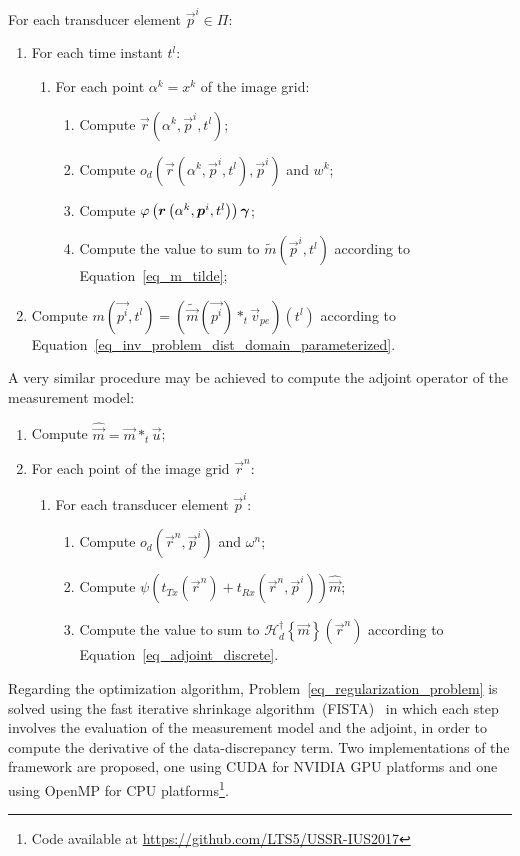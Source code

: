 \documentclass[conference]{IEEEtran}
\begin{document}
For each transducer element $\vec{p}^i \in \Pi$:
\begin{enumerate}
	\item For each time instant $t^l$:
	\begin{enumerate}
		\item For each point $\alpha^k = x^k$ of the image grid:
		\begin{enumerate}
			\item Compute $\vec{r}\left(\alpha^k, \vec{p}^i, t^l\right)$;
			\item Compute $o_d\left(\vec{r}\left(\alpha^k, \vec{p}^i, t^l\right), \vec{p}^i\right)$ and $w^k$;
			\item Compute $\varphi \left(\bm{r}\left(\alpha^k, \bm{p}^i, t^l\right)\right) \bm{\gamma}$;
			\item Compute the value to sum to $\tilde{m}\left(\vec{p}^i, t^l\right)$ according to Equation~\eqref{eq_m_tilde};
		\end{enumerate} 
	\end{enumerate}
	\item Compute $m \left(\vec{p^i}, t^l\right) = \left(\tilde{\vec{m}} \left(\vec{p^i}\right) \ast_t \vec{v}_{pe}\right) \left(t^l\right)$ according to Equation~\eqref{eq_inv_problem_dist_domain_parameterized}.
\end{enumerate}

A very similar procedure may be achieved to compute the adjoint operator of the measurement model:
\begin{enumerate}
	\item Compute $\hat{\vec{m}} = \vec{m} \ast_t \vec{u}$;
	\item For each point of the image grid $\vec{r}^n$:
	\begin{enumerate}
		\item For each transducer element $\vec{p}^i$:
		\begin{enumerate}
			\item Compute $o_d\left(\vec{r}^n, \vec{p}^i\right)$ and $\omega^n$;
			\item Compute $\psi \left(t_{Tx}\left(\vec{r}^n\right) + t_{Rx} \left( \vec{r}^n, \vec{p}^i \right) \right) \hat{\vec{m}}$;
			\item Compute the value to sum to $\mathcal{H}_d^\dagger \left\lbrace\vec{m}\right\rbrace \left(\vec{r}^n\right)$ according to Equation~\eqref{eq_adjoint_discrete}.
		\end{enumerate}
	\end{enumerate}
\end{enumerate}
Regarding the optimization algorithm, Problem~\eqref{eq_regularization_problem} is solved using the fast iterative shrinkage algorithm~(FISTA)~\cite{Beck_SIAM_2009} in which each step involves the evaluation of the measurement model and the adjoint, in order to compute the derivative of the data-discrepancy term. Two implementations of the framework are proposed, one using CUDA for NVIDIA GPU platforms and one using OpenMP for CPU platforms\footnote{Code available at \url{https://github.com/LTS5/USSR-IUS2017}}.
\end{document}
